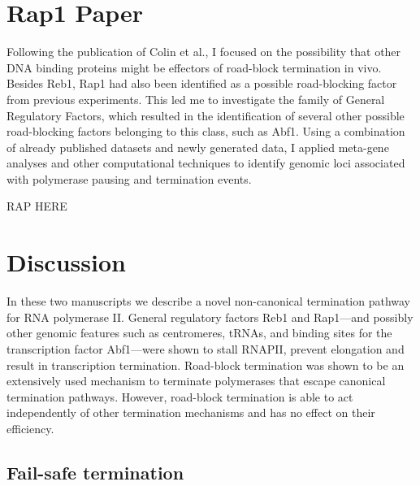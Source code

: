 \section{Rap1 Paper}

Following the publication of Colin et al., I focused on the possibility that other DNA binding proteins might be effectors of road-block termination in vivo. 
Besides Reb1, Rap1 had also been identified as a possible road-blocking factor from previous experiments. 
This led me to investigate the family of General Regulatory Factors, which resulted in the identification of several other possible road-blocking factors belonging to this class, such as Abf1. 
Using a combination of already published datasets and newly generated data, I applied meta-gene analyses and other computational techniques to identify genomic loci associated with polymerase pausing and termination events. 


\clearpage


%
RAP HERE

\clearpage

\section{Discussion}


In these two manuscripts we describe a novel non-canonical termination pathway for RNA polymerase II.
General regulatory factors Reb1 and Rap1—and possibly other genomic features such as centromeres, tRNAs, and binding sites for the transcription factor Abf1—were shown to stall RNAPII, prevent elongation and result in transcription termination.  
Road-block termination was shown to be an extensively used mechanism to terminate polymerases that escape canonical termination pathways. 
However, road-block termination is able to act independently of other termination mechanisms and has no effect on their efficiency. 

\subsection{Fail-safe termination}

